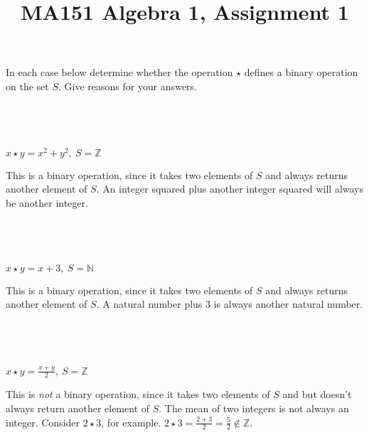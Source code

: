 \documentclass[a4paper]{article}
\title{MA151 Algebra 1, Assignment 1}
\begin{document}
\maketitle

\setlength{\parindent}{0em}
\setlength{\parskip}{1em}


\begin{questionbody}
In each case below determine whether the operation $\star$ defines a binary operation on the set $S$. Give reasons for your answers.
\end{questionbody}

\subsection{~} %

\begin{questionbody}
$x \star y = x^2 + y^2,\ S = \mathbb Z$
\end{questionbody}

This is a binary operation, since it takes two elements of $S$ and always returns another element of $S$. An integer squared plus another integer squared will always be another integer.

\subsection{~} %

\begin{questionbody}
$x \star y = x + 3,\ S = \mathbb N$
\end{questionbody}

This is a binary operation, since it takes two elements of $S$ and always returns another element of $S$. A natural number plus 3 is always another natural number.

\subsection{~} %

\begin{questionbody}
$x \star y = \frac{x + y}{2},\ S = \mathbb Z$
\end{questionbody}

This is \textit{not} a binary operation, since it takes two elements of $S$ and but doesn't always return another element of $S$. The mean of two integers is not always an integer. Consider $2 \star 3$, for example. $2 \star 3 = \frac{2 + 3}{2} = \frac52 \notin \mathbb Z$.
\end{document}
